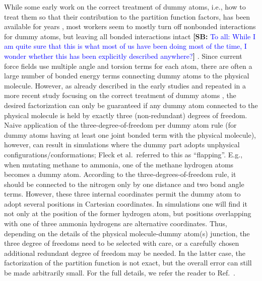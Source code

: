 \documentclass[9pt,bestpractices]{livecoms}
\newcommand{\sbnote}[1]{%
  {\bfseries{}[SB: }%
  {\textcolor{blue}{#1}}{\bfseries{}]}
}
\begin{document}
While some early work on the correct treatment of dummy atoms, i.e., how to treat them so that their contribution to the partition function factors, has been available for years \cite{Boresch_2002,Shobana_2000,Wang_2012}, most workers seem to mostly turn off nonbonded interactions for dummy atoms, but leaving all bonded interactions intact \sbnote{To all: While I am quite sure that this is what most of us have been doing most of the time, I wonder whether this has been explicitly described anywhere?}. Since current force fields use multiple angle and torsion terms for each atom, there are often a large number of bonded energy terms connecting dummy atoms to the physical molecule. However, as already described in the early studies and repeated in a more recent study focusing on the correct treatment of dummy atoms \cite{Fleck_2021}, the desired factorization can only be guaranteed if any dummy atom connected to the physical molecule is held by exactly three (non-redundant) degrees of freedom. Naive application of the three-degree-of-freedom per dummy atom rule (for dummy atoms having at least one joint bonded term with the physical molecule), however, can result in simulations where the dummy part adopts unphysical configurations/conformations; Fleck et al.~referred to this as ``flapping''. E.g., when mutating methane to ammonia, one of the methane hydrogen atoms becomes a dummy atom. According to the three-degrees-of-freedom rule, it should be connected to the nitrogen only by one distance and two bond angle terms. However, these three internal coordinates permit the dummy atom to adopt several positions in Cartesian coordinates. In simulations one will find it not only at the position of the former hydrogen atom, but positions overlapping with one of three ammonia hydrogens are alternative coordinates.   Thus, depending on the details of the physical molecule-dummy atom(s) junction, the three degree of freedoms need to be selected with care, or a carefully chosen additional redundant degree of freedom may be needed. In the latter case, the factorization of the partition function is not exact, but the overall error can still be made arbitrarily small. For the full details, we refer the reader to Ref.~\cite{Fleck_2021}. 
\end{document}
